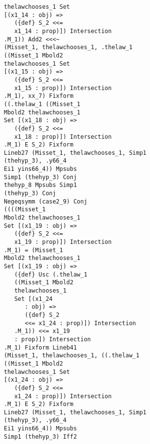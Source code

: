 \documentclass{article}
\begin{document}
\begin{verbatim}
                         thelawchooses_1 Set 
                         [(x1_14 : obj) => 
                            ({def} S_2 <<= 
                            x1_14 : prop)]) Intersection 
                         .M_1)) Add2 <<<~ 
                         (Misset_1, thelawchooses_1, .thelaw_1 
                         ((Misset_1 Mbold2 
                         thelawchooses_1 Set 
                         [(x1_15 : obj) => 
                            ({def} S_2 <<= 
                            x1_15 : prop)]) Intersection 
                         .M_1), xx_7) Fixform 
                         ((.thelaw_1 ((Misset_1 
                         Mbold2 thelawchooses_1 
                         Set [(x1_18 : obj) => 
                            ({def} S_2 <<= 
                            x1_18 : prop)]) Intersection 
                         .M_1) E S_2) Fixform 
                         Lineb27 (Misset_1, thelawchooses_1, Simp1 
                         (thehyp_3), .y66_4 
                         Ei1 yins66_4)) Mpsubs 
                         Simp1 (thehyp_3) Conj 
                         thehyp_8 Mpsubs Simp1 
                         (thehyp_3) Conj 
                         Negeqsymm (case2_9) Conj 
                         ((((Misset_1 
                         Mbold2 thelawchooses_1 
                         Set [(x1_19 : obj) => 
                            ({def} S_2 <<= 
                            x1_19 : prop)]) Intersection 
                         .M_1) = (Misset_1 
                         Mbold2 thelawchooses_1 
                         Set [(x1_19 : obj) => 
                            ({def} Usc (.thelaw_1 
                            ((Misset_1 Mbold2 
                            thelawchooses_1 
                            Set [(x1_24 
                               : obj) => 
                               ({def} S_2 
                               <<= x1_24 : prop)]) Intersection 
                            .M_1)) <<= x1_19 
                            : prop)]) Intersection 
                         .M_1) Fixform Lineb41 
                         (Misset_1, thelawchooses_1, ((.thelaw_1 
                         ((Misset_1 Mbold2 
                         thelawchooses_1 Set 
                         [(x1_24 : obj) => 
                            ({def} S_2 <<= 
                            x1_24 : prop)]) Intersection 
                         .M_1) E S_2) Fixform 
                         Lineb27 (Misset_1, thelawchooses_1, Simp1 
                         (thehyp_3), .y66_4 
                         Ei1 yins66_4)) Mpsubs 
                         Simp1 (thehyp_3) Iff2 

\end{verbatim}
\end{document}
